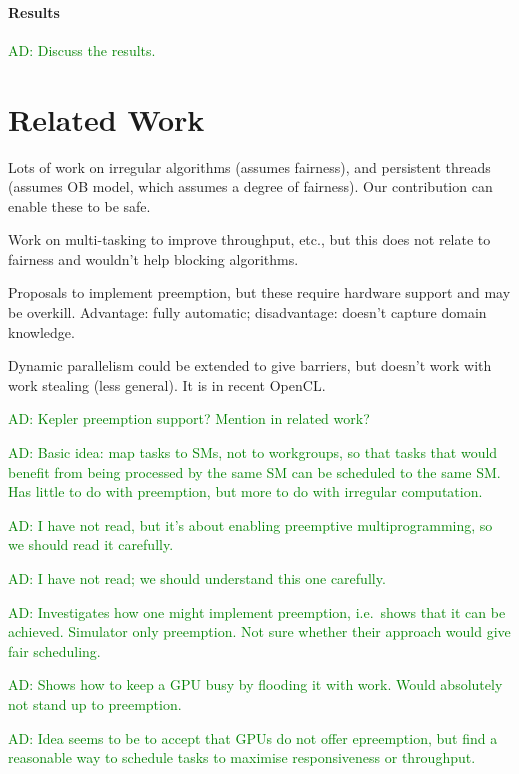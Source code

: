 \documentclass[numbers,nocopyrightspace,10pt]{sigplanconf}
\newcommand{\ADComment}[1]{\textcolor{green}{AD: #1}}
\begin{document}
\paragraph{Results}  \ADComment{Discuss the results.}



\section{Related Work}\label{sec:relatedwork}


Lots of work on irregular algorithms (assumes fairness), and persistent threads (assumes OB model, which assumes a degree of fairness).  Our contribution can enable these to be safe.

Work on multi-tasking to improve throughput, etc., but this does not relate to fairness and wouldn't help blocking algorithms.

Proposals to implement preemption, but these require hardware support and may be overkill.  Advantage: fully automatic; disadvantage: doesn't capture domain knowledge.

Dynamic parallelism could be extended to give barriers, but doesn't work with work stealing (less general).  It is in recent OpenCL.

\ADComment{Kepler preemption support?  Mention in related work?}


\cite{DBLP:conf/ics/WuCLSV15} \ADComment{Basic idea: map tasks to
  SMs, not to workgroups, so that tasks that would benefit from being
  processed by the same SM can be scheduled to the same SM.  Has
  little to do with preemption, but more to do with irregular
  computation.}

\cite{DBLP:conf/isca/TanasicGCRNV14} \ADComment{I have not read, but
  it's about enabling preemptive multiprogramming, so we should read
  it carefully.}

\cite{DBLP:conf/ppopp/Muyan-OzcelikO16} \ADComment{I have not read; we
  should understand this one carefully.}

\cite{DBLP:conf/asplos/ParkPM15} \ADComment{Investigates how one might
  implement preemption, i.e.\ shows that it can be achieved.
  Simulator only preemption.  Not sure whether their approach would
  give fair scheduling.}

\cite{DBLP:journals/tog/SteinbergerKBKDS14} \ADComment{Shows how to
  keep a GPU busy by flooding it with work.  Would absolutely not
  stand up to preemption.}

\cite{DBLP:conf/usenix/KatoLRI11} \ADComment{Idea seems to be to
  accept that GPUs do not offer epreemption, but find a reasonable way
  to schedule tasks to maximise responsiveness or throughput.}
\end{document}
